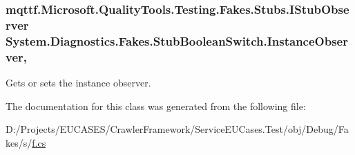 \hypertarget{class_system_1_1_diagnostics_1_1_fakes_1_1_stub_boolean_switch_aa1d1ba45215686cac9a258cf4468af01}{
\subsubsection[{Instance\-Observer}]{\setlength{\rightskip}{0pt plus 5cm}mqttf.\-Microsoft.\-Quality\-Tools.\-Testing.\-Fakes.\-Stubs.\-I\-Stub\-Observer System.\-Diagnostics.\-Fakes.\-Stub\-Boolean\-Switch.\-Instance\-Observer\hspace{0.3cm}{\ttfamily [get]}, {\ttfamily [set]}}}\label{class_system_1_1_diagnostics_1_1_fakes_1_1_stub_boolean_switch_aa1d1ba45215686cac9a258cf4468af01}


Gets or sets the instance observer.



The documentation for this class was generated from the following file\-:\begin{DoxyCompactItemize}
\item 
D\-:/\-Projects/\-E\-U\-C\-A\-S\-E\-S/\-Crawler\-Framework/\-Service\-E\-U\-Cases.\-Test/obj/\-Debug/\-Fakes/s/\hyperlink{s_2f_8cs}{f.\-cs}\end{DoxyCompactItemize}
